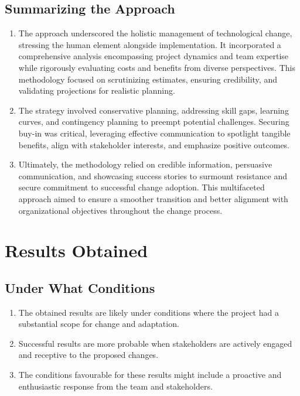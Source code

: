 \documentclass[11pt,letterpaper]{report}
\begin{document}
\section{Summarizing the Approach}
\begin{enumerate}

\item The approach underscored the holistic management of technological change, stressing the human element alongside implementation. It incorporated a comprehensive analysis encompassing project dynamics and team expertise while rigorously evaluating costs and benefits from diverse perspectives. This methodology focused on scrutinizing estimates, ensuring credibility, and validating projections for realistic planning.

\item The strategy involved conservative planning, addressing skill gaps, learning curves, and contingency planning to preempt potential challenges. Securing buy-in was critical, leveraging effective communication to spotlight tangible benefits, align with stakeholder interests, and emphasize positive outcomes.

\item Ultimately, the methodology relied on credible information, persuasive communication, and showcasing success stories to surmount resistance and secure commitment to successful change adoption. This multifaceted approach aimed to ensure a smoother transition and better alignment with organizational objectives throughout the change process.
\end{enumerate}


\chapter{Results Obtained}
\section{Under What Conditions}
\begin{enumerate}
    \item The obtained results are likely under conditions where the project had a substantial scope for change and adaptation.
    \item Successful results are more probable when stakeholders are actively engaged and receptive to the proposed changes.
    \item The conditions favourable for these results might include a proactive and enthusiastic response from the team and stakeholders.
\end{enumerate}
\end{document}
